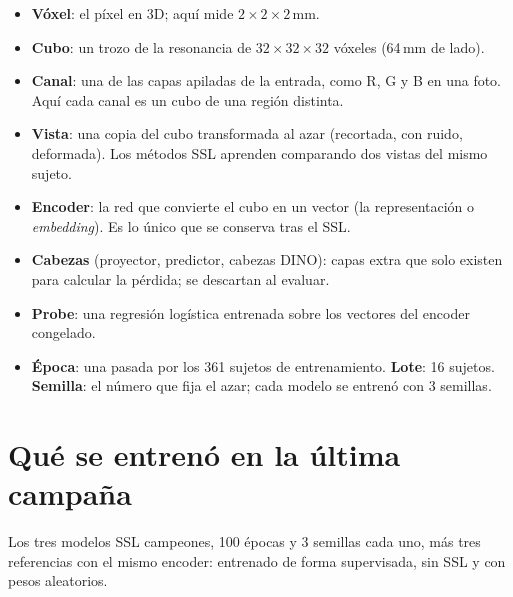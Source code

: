 \documentclass[11pt,a4paper]{article}
\begin{document}
\begin{ideabox}
\begin{itemize}[leftmargin=12pt]
\item \textbf{Vóxel}: el píxel en 3D; aquí mide $2\times2\times2$\,mm.
\item \textbf{Cubo}: un trozo de la resonancia de $32\times32\times32$ vóxeles (64\,mm de lado).
\item \textbf{Canal}: una de las capas apiladas de la entrada, como R, G y B en una foto. Aquí
  cada canal es un cubo de una región distinta.
\item \textbf{Vista}: una copia del cubo transformada al azar (recortada, con ruido, deformada).
  Los métodos SSL aprenden comparando dos vistas del mismo sujeto.
\item \textbf{Encoder}: la red que convierte el cubo en un vector (la representación o
  \emph{embedding}). Es lo único que se conserva tras el SSL.
\item \textbf{Cabezas} (proyector, predictor, cabezas DINO): capas extra que solo existen para
  calcular la pérdida; se descartan al evaluar.
\item \textbf{Probe}: una regresión logística entrenada sobre los vectores del encoder congelado.
\item \textbf{Época}: una pasada por los 361 sujetos de entrenamiento. \textbf{Lote}: 16 sujetos.
  \textbf{Semilla}: el número que fija el azar; cada modelo se entrenó con 3 semillas.
\end{itemize}
\end{ideabox}

\section{Qué se entrenó en la última campaña}
\label{sec:campaign}

\begin{tldrbox}
Los tres modelos SSL campeones, 100 épocas y 3 semillas cada uno, más tres referencias con el mismo
encoder: entrenado de forma supervisada, sin SSL y con pesos aleatorios.
\end{tldrbox}
\end{document}
